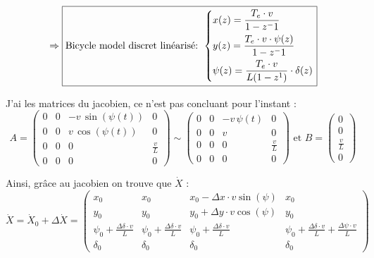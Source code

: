 \documentclass[a4paper,12pt]{extarticle}
\begin{document}
\begin{equation}
    \left .
    \Rightarrow
    \right . 
\boxed{
    \text{Bicycle model discret linéarisé: }
    \begin{dcases}
        x(z) = \frac{T_e\cdot v}{1-z^-1} \\
        y(z) = \frac{T_e\cdot v\cdot\psi(z)}{1-z^-1} \\
        \psi(z) = \frac{T_e\cdot v}{L(1-z^1)}\cdot\delta(z) \\
    \end{dcases}
}
\end{equation}

J'ai les matrices du jacobien, ce n'est pas concluant pour l'instant :
\begin{equation*}
    A = 
    \left(\begin{array}{cccc}
        0 & 0 & -v\,\sin \left(\psi \left(t\right)\right) & 0\\
        0 & 0 & v\,\cos \left(\psi \left(t\right)\right) & 0\\
        0 & 0 & 0 & \frac{v}{L}\\
        0 & 0 & 0 & 0
        \end{array}\right) 
    \sim
    \left(\begin{array}{cccc}
        0 & 0 & -v\,\psi \left(t\right) & 0\\
        0 & 0 & v & 0\\
        0 & 0 & 0 & \frac{v}{L}\\
        0 & 0 & 0 & 0
        \end{array}\right) 
    \text{\ et \ } 
    B=\left(\begin{array}{c}
        0\\
        0\\
        \frac{v}{L}\\
        0
        \end{array}\right)
\end{equation*}    

Ainsi, grâce au jacobien on trouve que $\dot{X}$ : 
\begin{equation*}
    \dot{X} = \dot{X}_0 + \Delta \dot{X} =  
    \left(\begin{array}{cccc}
        x_0 & x_0 & x_0-\Delta x \cdot v\sin(\psi) & x_0\\
        y_0 & y_0 & y_0 + \Delta y \cdot v\cos(\psi) & y_0\\
        \psi_0 + \frac{\Delta \delta \cdot v}{L} & \psi_0 + \frac{\Delta \delta \cdot v}{L}  & \psi_0 + \frac{\Delta \delta \cdot v}{L}  & \psi_0 + \frac{\Delta \delta \cdot v}{L} + \frac{\Delta \psi\cdot v}{L} \\
        \delta_0 & \delta_0 & \delta_0 & \delta_0
        \end{array}\right) 
\end{equation*}  
\end{document}
